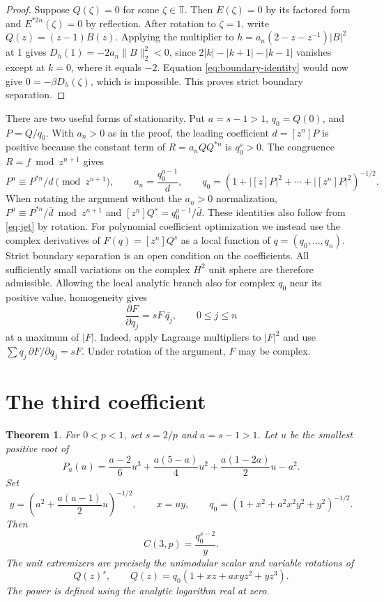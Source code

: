 \documentclass[11pt]{article}
\newtheorem{theorem}{Theorem}
\newcommand{\T}{\mathbb T}
\newcommand{\coef}[1]{[z^{#1}]}
\begin{document}
\begin{proof}
Suppose \(Q(\zeta)=0\) for some \(\zeta\in\T\). Then \(E(\zeta)=0\)
by its factored form and \(E^{*2n}(\zeta)=0\) by reflection.
After rotation to \(\zeta=1\), write \(Q(z)=(z-1)B(z)\).
Applying the multiplier to
\(h=a_n(2-z-z^{-1})|B|^2\) at 1 gives
\(D_h(1)=-2a_n\|B\|_2^2<0\), since
\(2|k|-|k+1|-|k-1|\) vanishes except at \(k=0\), where it
equals \(-2\). Equation \eqref{eq:boundary-identity} would now give
\(0=-\beta D_h(\zeta)\), which is impossible. This proves strict
boundary separation.
\end{proof}

There are two useful forms of stationarity. Put \(a=s-1>1\),
\(q_0=Q(0)\), and \(P=Q/q_0\). With \(a_n>0\) as in the proof,
the leading coefficient \(d=\coef n P\) is positive because the
constant term of \(R=a_n QQ^{*n}\) is \(q_0^s>0\).
The congruence \(R=f\bmod z^{n+1}\) gives
\begin{equation}\label{eq:jet}
 P^a\equiv P^{*n}/d\pmod{z^{n+1}},\qquad
 a_n=\frac{q_0^{a-1}}{d},\qquad
 q_0=(1+|[z]P|^2+\cdots+|\coef nP|^2)^{-1/2}.
\end{equation}
When rotating the argument without the \(a_n>0\) normalization,
\(P^a\equiv P^{*n}/\bar d\bmod z^{n+1}\) and
\(\coef n Q^s=q_0^{a-1}/\bar d\). These identities also follow
from \eqref{eq:jet} by rotation.
For polynomial coefficient optimization we instead use the complex
derivatives of \(F(q)=\coef n Q^s\) as a local function of
\(q=(q_0,\ldots,q_n)\). Strict boundary separation is an open
condition on the coefficients. All sufficiently small variations
on the complex \(H^2\) unit sphere are therefore admissible.
Allowing the local analytic branch also for complex \(q_0\) near
its positive value, homogeneity gives
\begin{equation}\label{eq:sphere-lagrange}
 \frac{\partial F}{\partial q_j}=s F\,\overline{q_j},
                  \qquad 0\le j\le n
\end{equation}
at a maximum of \(|F|\). Indeed, apply Lagrange multipliers to
\(|F|^2\) and use \(\sum q_j\,\partial F/\partial q_j=sF\).
Under rotation of the argument, \(F\) may be complex.
\section{The third coefficient}

\begin{theorem}\label{thm:third}
For \(0<p<1\), set \(s=2/p\) and \(a=s-1>1\). Let \(u\) be the
smallest positive root of
\begin{equation}\label{eq:third-cubic}
 P_a(u)=\frac{a-2}{6}u^3+\frac{a(5-a)}4u^2
             +\frac{a(1-2a)}2u-a^2 .
\end{equation}
Set
\[
 y=\left(a^2+\frac{a(a-1)}2u\right)^{-1/2},\qquad x=uy,
 \qquad q_0=\left(1+x^2+a^2x^2y^2+y^2\right)^{-1/2}.
\]
Then
\[
 C(3,p)=\frac{q_0^{s-2}}{y}.
\]
The unit extremizers are precisely the unimodular scalar and variable rotations of
\[
 Q(z)^s,\qquad Q(z)=q_0(1+xz+a x y z^2+y z^3).
\]
The power is defined using the analytic logarithm real at zero.
\end{theorem}
\end{document}
